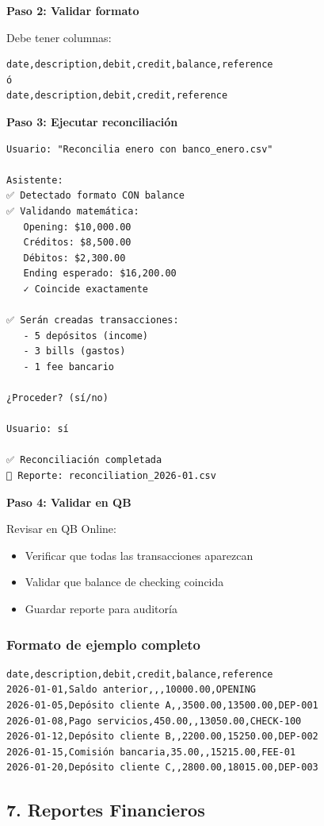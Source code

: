 \documentclass[12pt,oneside]{article}
\begin{document}
\textbf{Paso 2: Validar formato}

Debe tener columnas:
\begin{verbatim}
date,description,debit,credit,balance,reference
ó
date,description,debit,credit,reference
\end{verbatim}

\textbf{Paso 3: Ejecutar reconciliación}

\begin{verbatim}
Usuario: "Reconcilia enero con banco_enero.csv"

Asistente:
✅ Detectado formato CON balance
✅ Validando matemática:
   Opening: $10,000.00
   Créditos: $8,500.00
   Débitos: $2,300.00
   Ending esperado: $16,200.00
   ✓ Coincide exactamente

✅ Serán creadas transacciones:
   - 5 depósitos (income)
   - 3 bills (gastos)
   - 1 fee bancario

¿Proceder? (sí/no)

Usuario: sí

✅ Reconciliación completada
💾 Reporte: reconciliation_2026-01.csv
\end{verbatim}

\textbf{Paso 4: Validar en QB}

Revisar en QB Online:
\begin{itemize}
    \item Verificar que todas las transacciones aparezcan
    \item Validar que balance de checking coincida
    \item Guardar reporte para auditoría
\end{itemize}

\subsubsection{Formato de ejemplo completo}

\begin{verbatim}
date,description,debit,credit,balance,reference
2026-01-01,Saldo anterior,,,10000.00,OPENING
2026-01-05,Depósito cliente A,,3500.00,13500.00,DEP-001
2026-01-08,Pago servicios,450.00,,13050.00,CHECK-100
2026-01-12,Depósito cliente B,,2200.00,15250.00,DEP-002
2026-01-15,Comisión bancaria,35.00,,15215.00,FEE-01
2026-01-20,Depósito cliente C,,2800.00,18015.00,DEP-003
\end{verbatim}

\subsection{7. Reportes Financieros}
\end{document}
